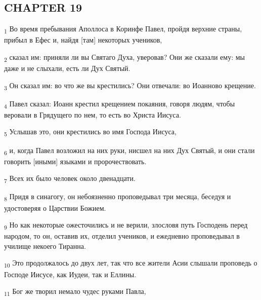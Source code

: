 \subsection{CHAPTER 19}
\begin{tcolorbox}
\textsubscript{1} Во время пребывания Аполлоса в Коринфе Павел, пройдя верхние страны, прибыл в Ефес и, найдя [там] некоторых учеников,
\end{tcolorbox}
\begin{tcolorbox}
\textsubscript{2} сказал им: приняли ли вы Святаго Духа, уверовав? Они же сказали ему: мы даже и не слыхали, есть ли Дух Святый.
\end{tcolorbox}
\begin{tcolorbox}
\textsubscript{3} Он сказал им: во что же вы крестились? Они отвечали: во Иоанново крещение.
\end{tcolorbox}
\begin{tcolorbox}
\textsubscript{4} Павел сказал: Иоанн крестил крещением покаяния, говоря людям, чтобы веровали в Грядущего по нем, то есть во Христа Иисуса.
\end{tcolorbox}
\begin{tcolorbox}
\textsubscript{5} Услышав это, они крестились во имя Господа Иисуса,
\end{tcolorbox}
\begin{tcolorbox}
\textsubscript{6} и, когда Павел возложил на них руки, нисшел на них Дух Святый, и они стали говорить [иными] языками и пророчествовать.
\end{tcolorbox}
\begin{tcolorbox}
\textsubscript{7} Всех их было человек около двенадцати.
\end{tcolorbox}
\begin{tcolorbox}
\textsubscript{8} Придя в синагогу, он небоязненно проповедывал три месяца, беседуя и удостоверяя о Царствии Божием.
\end{tcolorbox}
\begin{tcolorbox}
\textsubscript{9} Но как некоторые ожесточились и не верили, злословя путь Господень перед народом, то он, оставив их, отделил учеников, и ежедневно проповедывал в училище некоего Тиранна.
\end{tcolorbox}
\begin{tcolorbox}
\textsubscript{10} Это продолжалось до двух лет, так что все жители Асии слышали проповедь о Господе Иисусе, как Иудеи, так и Еллины.
\end{tcolorbox}
\begin{tcolorbox}
\textsubscript{11} Бог же творил немало чудес руками Павла,
\end{tcolorbox}
